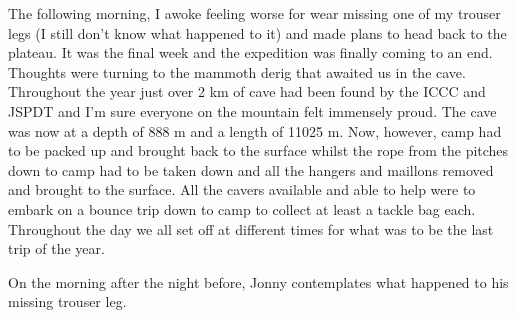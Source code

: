 The following morning, I awoke feeling worse for wear missing one of my
trouser legs (I still don't know what happened to it) and made plans to
head back to the plateau. It was the final week and the expedition was
finally coming to an end. Thoughts were turning to the mammoth derig
that awaited us in the cave. Throughout the year just over 2 km of cave had
been found by the ICCC and JSPDT and I'm sure everyone on the mountain
felt immensely proud. The cave was now at a depth of 888 m and a length
of 11025 m. Now, however, camp had to be packed up and brought back to
the surface whilst the rope from the pitches down to camp had to be
taken down and all the hangers and maillons removed and brought to the
surface. All the cavers available and able to help were to embark on a
bounce trip down to camp to collect at least a tackle bag each.
Throughout the day we all set off at different times for what was to be
the last trip of the year.

\begin{marginfigure}
\checkoddpage \ifoddpage \forcerectofloat \else \forceversofloat \fi
\centering
 \caption{On the morning after the night before, Jonny contemplates what happened to his missing trouser leg. }
 \label{jonny leg}
\end{marginfigure}

